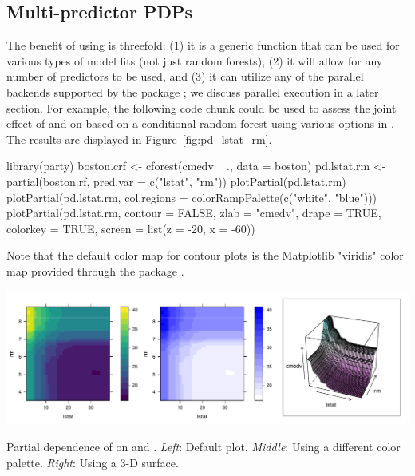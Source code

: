 \subsection{Multi-predictor PDPs}

The benefit of using  is threefold: (1) it is a generic function that can be used for various types of model fits (not just random forests), (2) it will allow for any number of predictors to be used, and (3) it can utilize any of the parallel backends supported by the  package \citep{foreach-pkg}; we discuss parallel execution in a later section. For example, the following code chunk could be used to assess the joint effect of  and  on  based on a conditional random forest using various options in . The results are displayed in Figure~\ref{fig:pd_lstat_rm}.
\begin{example}
library(party)
boston.crf <- cforest(cmedv ~ ., data = boston)
pd.lstat.rm <- partial(boston.rf, pred.var = c("lstat", "rm"))
plotPartial(pd.lstat.rm)
plotPartial(pd.lstat.rm, col.regions = colorRampPalette(c("white", "blue")))
plotPartial(pd.lstat.rm, contour = FALSE, zlab = "cmedv", drape = TRUE,
            colorkey = TRUE, screen = list(z = -20, x = -60))
\end{example}
Note that the default color map for contour plots is the Matplotlib "viridis" color map provided through the  package \citep{viridis-pkg}.

\begin{widefigure}[htbp]
  \centering
  \includegraphics[width=1.0\linewidth]{pd_lstat_rm}
  \caption{Partial dependence of  on  and . \textit{Left}: Default plot. \textit{Middle}: Using a different color palette. \textit{Right}: Using a 3-D surface.}
  \label{fig:pd_lstat_rm}
\end{widefigure}

